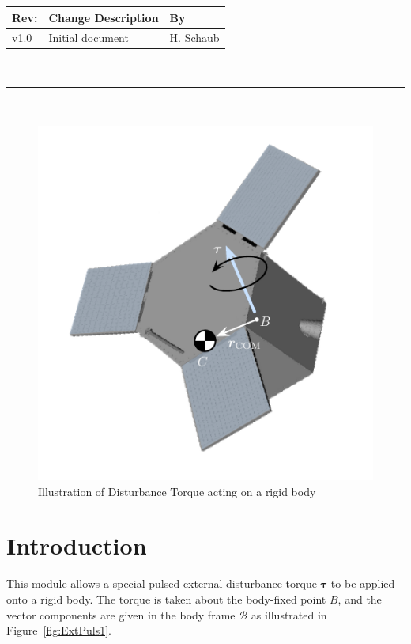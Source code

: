 \documentclass[]{BasiliskReportMemo}
\begin{document}
\makeCover


%
%
\pagestyle{empty}
{\renewcommand{\arraystretch}{1.1}
\noindent
\begin{longtable}{|p{0.5in}|p{4.5in}|p{1.14in}|}
\hline
{\bfseries Rev}: & {\bfseries Change Description} & {\bfseries By} \\
\hline
v1.0 & Initial document & H. Schaub \\
\hline

\end{longtable}
}

\newpage
\setcounter{page}{1}
\pagestyle{fancy}

\tableofcontents
~\\ \hrule ~\\


\begin{figure}[htb]
	\centerline{
	\includegraphics[]{Figures/TorqueDiagram1}
	}
	\caption{Illustration of Disturbance Torque acting on a rigid body}
	\label{fig:extPulse1}
\end{figure}
\section{Introduction}
This module allows a special pulsed external disturbance torque $\bm \tau$ to be applied onto a rigid body.   The torque is taken about the body-fixed point $B$, and the vector components are given in the body frame $\mathcal{B}$ as illustrated in Figure~\ref{fig:ExtPuls1}.  
\end{document}
